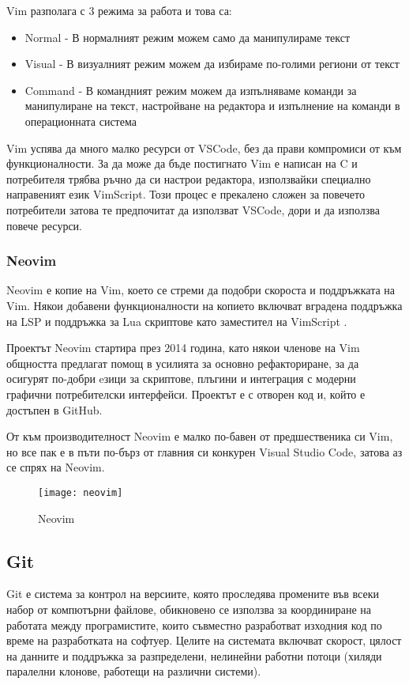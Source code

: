Vim разполага с 3 режима за работа и това са:
\begin{itemize}
\item Normal - В нормалният режим можем само да манипулираме текст
\item Visual - В визуалният режим можем да избираме по-голими региони от текст
\item Command - В командният режим можем да изпълняваме команди за манипулиране
на текст, настройване на редактора и изпълнение на команди в операционната
система \end{itemize}

Vim успява да много малко ресурси от VSCode, без да прави компромиси от към
функционалности. За да може да бъде постигнато Vim е написан на C и потребителя
трябва ръчно да си настрои редактора, използвайки специално направеният език
VimScript. Този процес е прекалено сложен за повечето потребители затова те
предпочитат да използват VSCode, дори и да използва повече ресурси.

\subsubsection{Neovim}
Neovim е копие на Vim, което се стреми да подобри скороста и поддръжката на
Vim. Някои добавени функционалности на копието включват вградена поддръжка на
LSP и поддръжка за Lua скриптове като заместител на VimScript \cite{neovim_wikipedia}.

Проектът Neovim стартира през 2014 година, като някои членове на Vim общността
предлагат помощ в усилията за основно рефакториране, за да осигурят по-добри
eзици за скриптове, плъгини и интеграция с модерни графични потребителски интерфейси.
Проектът е с отворен код и, който е достъпен в GitHub. \cite{neovim_github}

От към производителност Neovim е малко по-бавен от предшественика си Vim, но
все пак е в пъти по-бърз от главния си конкурен Visual Studio Code, затова аз
се спрях на Neovim.

\begin{figure}[!htb]
  \texttt{[image: neovim]}
  \centering
  \caption{Neovim}
  \label{fig:neovim}
\end{figure}

\subsection{Git}
Git е система за контрол на версиите, която проследява промените във всеки
набор от компютърни файлове, обикновено се използва за координиране на работата
между програмистите, които съвместно разработват изходния код по време на
разработката на софтуер. Целите на системата включват скорост, цялост на
данните и поддръжка за разпределени, нелинейни работни потоци (хиляди паралелни
клонове, работещи на различни системи).

